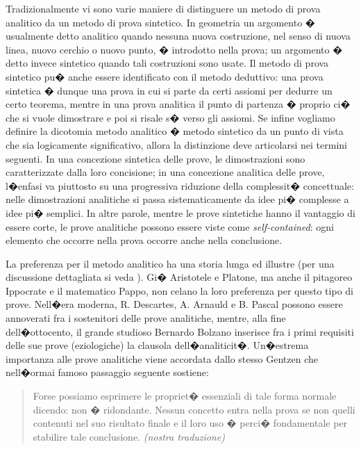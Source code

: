 \documentclass[a4paper,12pt]{aphex}
\begin{document}
Tradizionalmente vi sono varie maniere di distinguere un metodo di prova analitico da un metodo di prova sintetico. In geometria un argomento � usualmente detto analitico quando nessuna nuova costruzione, nel senso di nuova linea, nuovo cerchio o nuovo punto, � introdotto nella prova; un argomento � detto invece sintetico quando tali costruzioni sono usate.  
Il metodo di prova sintetico pu� anche essere  identificato con il metodo deduttivo:  una prova sintetica � dunque una prova in cui si parte da certi assiomi per dedurre un certo teorema, mentre in una prova analitica il punto di partenza � proprio ci� che si vuole dimostrare e poi si risale s� verso gli assiomi. 
Se infine vogliamo definire la dicotomia metodo analitico � metodo sintetico da un punto di vista che sia logicamente significativo, allora la distinzione deve articolarsi nei termini seguenti. In una concezione sintetica delle prove, le dimostrazioni sono caratterizzate dalla loro concisione; in una concezione analitica delle prove, l�enfasi va piuttosto su una progressiva riduzione della complessit� concettuale: nelle dimostrazioni analitiche si passa sistematicamente da idee pi� complesse a idee pi� semplici.  In altre parole, mentre le prove sintetiche hanno il vantaggio di essere corte, le prove analitiche possono essere viste come \emph{self-contained}: ogni elemento che occorre nella prova occorre anche nella conclusione.


La preferenza per il metodo analitico ha una storia lunga ed illustre (per una discussione dettagliata si veda \cite{poggiolesi3}). Gi� Aristotele e Platone, ma anche il pitagoreo Ippocrate e il matematico Pappo, non celano la loro preferenza per questo tipo di prove. Nell�era moderna, R. Descartes, A. Arnauld e B. Pascal possono essere annoverati fra i sostenitori delle prove analitiche, mentre, alla fine dell�ottocento, il grande studioso Bernardo Bolzano inserisce fra i primi requisiti delle sue prove (eziologiche) la clausola dell�analiticit�. Un�estrema importanza alle prove analitiche viene accordata dallo stesso Gentzen che nell�ormai famoso passaggio seguente sostiene:


\begin{quotation}
Forse possiamo esprimere le propriet� essenziali di tale forma normale dicendo: non � ridondante. Nessun concetto entra nella prova se non quelli contenuti nel suo risultato finale e il loro uso � perci� fondamentale per stabilire tale conclusione. \cite[p. 91]{gentzen} \emph{(nostra traduzione)}
\end{quotation}
\end{document}
